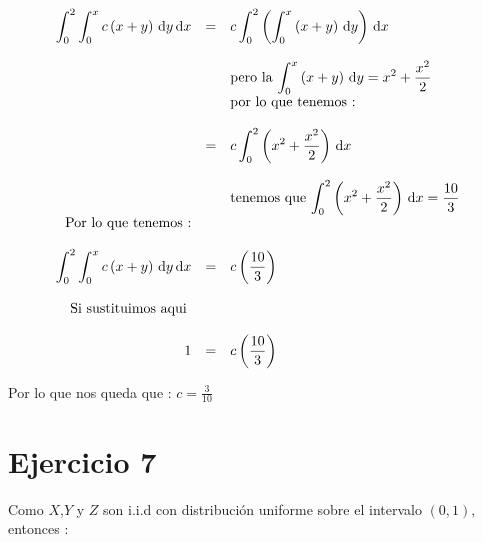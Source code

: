 \documentclass[12pt]{article}
\begin{document}
    \begin{equation*}
        \begin{array}{rcl}
            \displaystyle \int_{0}^{2} \int_{0}^{x} c\left(x+y \right) \,\mathrm{d}y \,\mathrm{d}x  & = & \displaystyle c  \int_{0}^{2} \left( \int_{0}^{x} \left(x+y \right) \,\mathrm{d}y \right)\,\mathrm{d}x 
            \\
            \\
            && \mbox{pero la $ \displaystyle  \int_{0}^{x} \left(x+y \right) \,\mathrm{d}y = x^2 + \frac{x^2}{2} $}
            \\
            && \mbox{por lo que tenemos : }
            \\
            \\
            & = &  \displaystyle c  \int_{0}^{2} \left(x^2 + \frac{x^2}{2}\right)\,\mathrm{d}x 
            \\
            \\
            && \mbox{tenemos que $ \displaystyle \int_{0}^{2} \left(x^2 + \frac{x^2}{2}\right)\,\mathrm{d}x  = \frac{10}{3}$ }
            \\
            \mbox{Por lo que tenemos  :}&&
            \\
            \\
            \displaystyle \int_{0}^{2} \int_{0}^{x} c\left(x+y \right) \,\mathrm{d}y \,\mathrm{d}x  & = & \displaystyle c \left(\frac{10}{3}\right)
            \\
            \\
            \mbox{Si sustituimos aqui }&&
            \\
            \\
            1 & = & \displaystyle c \left(\frac{10}{3}\right)
        \end{array}
    \end{equation*}

    \begin{flushleft}
        Por lo que nos queda que : $ \displaystyle c = \frac{3}{10}$
    \end{flushleft}




    \section*{Ejercicio 7} 

    \begin{flushleft}
        Como $X$,$Y$ y $Z$ son i.i.d  con distribuci\'on uniforme sobre el intervalo  $\left(0,1\right)$, entonces :
    \end{flushleft}
    
\end{document}
